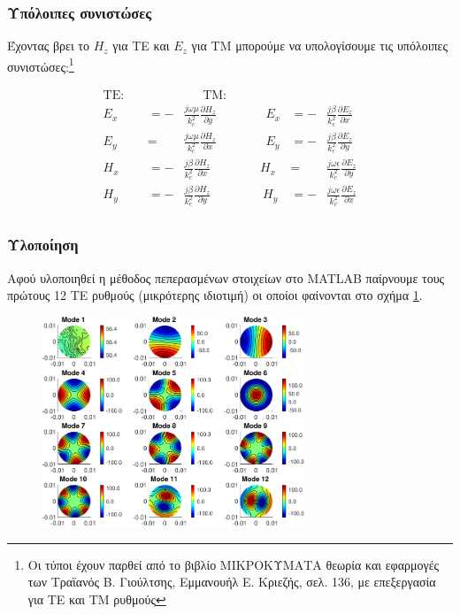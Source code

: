 \documentclass[10pt, letterpaper]{article}
\newcommand{\en}{\selectlanguage{english}}
\newcommand{\gr}{\selectlanguage{greek}}
\begin{document}
\subsubsection*{Υπόλοιπες συνιστώσες}

Έχοντας βρει το $H_z$ για ΤΕ και $E_z$ για ΤΜ μπορούμε να υπολογίσουμε τις υπόλοιπες συνιστώσες:\footnote{Οι τύποι έχουν παρθεί από
το βιβλίο ΜΙΚΡΟΚΥΜΑΤΑ θεωρία και εφαρμογές των Τραϊανός Β. Γιούλτσης, Εμμανουήλ Ε. Κριεζής, σελ. 136, με επεξεργασία για ΤΕ και ΤΜ ρυθμούς}


\begin{equation}
  \begin{aligned}
    \text{TE}: \ \ \ \ \ & &     \ \ \ \ \ \ \  \text{TM}: \ \ \ \ \ & & \\ 
    E_x &= - &\frac{j \omega \mu}{k_c^2} \frac{\partial H_z}{\partial y} \ \ \ \ \ \ \ \ \ \ \ \ \ \ \ \ \ \         E_x &= - &\frac{j \beta}{k_c^2} \frac{\partial E_z}{\partial x}  \\ 
    E_y &=  &\frac{j \omega \mu}{k_c^2} \frac{\partial H_z}{\partial x} \ \ \ \ \ \ \ \ \ \ \ \ \ \ \ \  \  \        E_y &= - &\frac{j \beta}{k_c^2} \frac{\partial E_z}{\partial y}  \\ 
    H_x &= - &\frac{j \beta}{k_c^2} \frac{\partial H_z}{\partial x}  \ \ \ \ \ \ \ \ \ \ \ \ \ \ \ \ \ \         H_x &=   &\frac{j \omega \epsilon }{k_c^2} \frac{\partial E_z}{\partial y} \\ 
    H_y &= - &\frac{j \beta}{k_c^2} \frac{\partial H_z}{\partial y}   \ \ \ \ \ \ \ \ \ \ \ \ \ \ \ \ \ \ \     H_y &= - &\frac{j \omega \epsilon }{k_c^2} \frac{\partial E_z}{\partial x}  \\ 
  \end{aligned}
\end{equation}




\subsubsection*{Υλοποίηση}

Αφού υλοποιηθεί η μέθοδος πεπερασμένων στοιχείων στο \en MATLAB \gr παίρνουμε τους πρώτους 12 ΤΕ ρυθμούς (μικρότερης ιδιοτιμή)
οι οποίοι φαίνονται στο σχήμα \ref{fig:TE_12_first}. 


\begin{figure}[h]
  \centering
  \includegraphics[width=0.7\textwidth]{TE_first_12_modes.pdf}
  \caption{}
  \label{fig:TE_12_first}
\end{figure}
\end{document}
